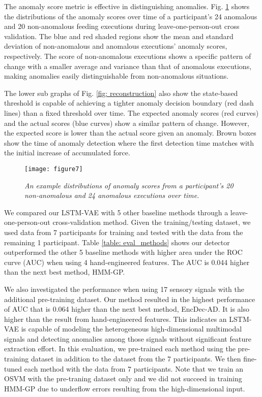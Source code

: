 \documentclass[letterpaper, 10 pt, conference]{ieeeconf}
\begin{document}
The anomaly score metric is effective in distinguishing anomalies. Fig. \ref{fig: anomaly_score} shows the distributions of the anomaly scores over time of a participant's 24 anomalous and 20 non-anomalous feeding executions during leave-one-person-out cross validation. The blue and red shaded regions show the mean and standard deviation of non-anomalous and anomalous executions' anomaly scores, respectively. The score of non-anomalous executions shows a specific pattern of change with a smaller average and variance than that of anomalous executions, making anomalies easily distinguishable from non-anomalous situations.

The lower sub graphs of Fig. \ref{fig: reconstruction} also show the state-based threshold is capable of achieving a tighter anomaly decision boundary (red dash lines) than a fixed threshold over time. The expected anomaly scores (red curves) and the actual scores (blue curves) show a similar pattern of change. However, the expected score is lower than the actual score given an anomaly. Brown boxes show the time of anomaly detection where the first detection time matches with the initial increase of accumulated force.

\begin{figure}[t]
	\centering
	\texttt{[image: figure7]} 
	\caption{\textit{An example distributions of anomaly scores from a participant's 20 non-anomalous and 24 anomalous executions over time.}}
    \vspace{-1.5em}
	\label{fig: anomaly_score}
\end{figure}

We compared our LSTM-VAE with 5 other baseline methods through a leave-one-person-out cross-validation method. Given the training/testing dataset, we used data from 7 participants for training and tested with the data from the remaining 1 participant. Table \ref{table: eval_methods} shows our detector outperformed the other 5 baseline methods with higher area under the ROC curve (AUC) when using 4 hand-engineered features. The AUC is 0.044 higher than the next best method, HMM-GP. 

We also investigated the performance when using 17 sensory signals with the additional pre-training dataset. Our method resulted in the highest performance of AUC that is 0.064 higher than the next best method, EncDec-AD. It is also higher than the result from hand-engineered features. This indicates an LSTM-VAE is capable of modeling the heterogeneous high-dimensional multimodal signals and detecting anomalies among those signals without significant feature extraction effort. In this evaluation, we pre-trained each method using the pre-training dataset in addition to the dataset from the 7 participants. We then fine-tuned each method with the data from 7 participants. Note that we train an OSVM with the pre-traning dataset only and we did not succeed in training HMM-GP due to underflow errors resulting from the high-dimensional input.
\end{document}
